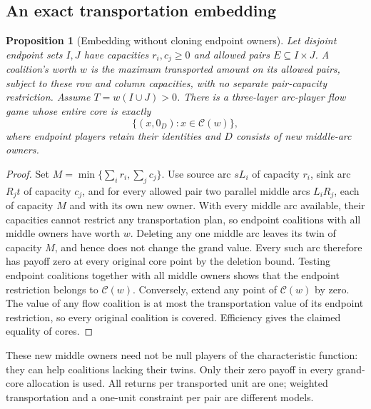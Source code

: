 \documentclass[11pt]{article}
\newtheorem{proposition}[theorem]{Proposition}
\theoremstyle{remark}
\newcommand{\core}{\mathcal C}
\begin{document}
\subsection{An exact transportation embedding}
\begin{proposition}[Embedding without cloning endpoint owners]\label{flow:embedding}
Let disjoint endpoint sets $I,J$ have capacities $r_i,c_j\ge0$ and
allowed pairs $E\subseteq I\times J$. A coalition's worth $w$ is the
maximum transported amount on its allowed pairs, subject to these row
and column capacities, with no separate pair-capacity restriction.
Assume $T=w(I\cup J)>0$. There is a three-layer arc-player flow game
whose entire core is exactly
\[
                  \{(x,0_D):x\in\core(w)\},
\]
where endpoint players retain their identities and $D$ consists of new
middle-arc owners.
\end{proposition}
\begin{proof}
Set $M=\min\{\sum_i r_i,\sum_j c_j\}$. Use source arc $sL_i$ of
capacity $r_i$, sink arc $R_jt$ of capacity $c_j$, and for every allowed
pair two parallel middle arcs $L_iR_j$, each of capacity $M$ and with
its own new owner. With every middle arc available, their capacities
cannot restrict any transportation plan, so endpoint coalitions with
all middle owners have worth $w$.
Deleting any one middle arc leaves its twin of capacity $M$, and hence
does not change the grand value. Every such arc therefore has payoff
zero at every original core point by the deletion bound. Testing endpoint
coalitions together with all middle owners shows that the endpoint
restriction belongs to $\core(w)$. Conversely, extend any point of
$\core(w)$ by zero. The value of any flow coalition is at most the
transportation value of its endpoint restriction, so every original
coalition is covered. Efficiency gives the claimed equality of cores.
\end{proof}
These new middle owners need not be null players of the characteristic
function: they can help coalitions lacking their twins. Only their
zero payoff in every grand-core allocation is used. All returns per
transported unit are one; weighted transportation and a one-unit
constraint per pair are different models.
\end{document}
